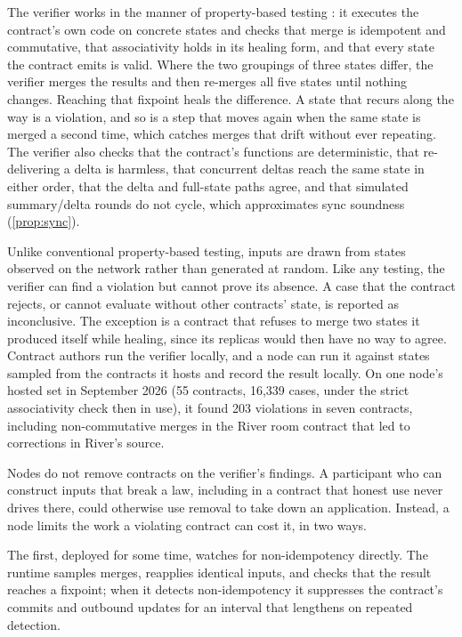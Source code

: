 The verifier works in the manner of property-based testing \citep{claessen2000quickcheck}: it executes the contract's own code on concrete states and checks that merge is idempotent and commutative, that associativity holds in its healing form, and that every state the contract emits is valid. Where the two groupings of three states differ, the verifier merges the results and then re-merges all five states until nothing changes. Reaching that fixpoint heals the difference. A state that recurs along the way is a violation, and so is a step that moves again when the same state is merged a second time, which catches merges that drift without ever repeating. The verifier also checks that the contract's functions are deterministic, that re-delivering a delta is harmless, that concurrent deltas reach the same state in either order, that the delta and full-state paths agree, and that simulated summary/delta rounds do not cycle, which approximates sync soundness (\cref{prop:sync}).

Unlike conventional property-based testing, inputs are drawn from states observed on the network rather than generated at random. Like any testing, the verifier can find a violation but cannot prove its absence. A case that the contract rejects, or cannot evaluate without other contracts' state, is reported as inconclusive. The exception is a contract that refuses to merge two states it produced itself while healing, since its replicas would then have no way to agree. Contract authors run the verifier locally, and a node can run it against states sampled from the contracts it hosts and record the result locally. On one node's hosted set in September 2026 (55 contracts, 16{,}339 cases, under the strict associativity check then in use), it found 203 violations in seven contracts, including non-commutative merges in the River room contract that led to corrections in River's source.

Nodes do not remove contracts on the verifier's findings. A participant who can construct inputs that break a law, including in a contract that honest use never drives there, could otherwise use removal to take down an application. Instead, a node limits the work a violating contract can cost it, in two ways.

The first, deployed for some time, watches for non-idempotency directly. The runtime samples merges, reapplies identical inputs, and checks that the result reaches a fixpoint; when it detects non-idempotency it suppresses the contract's commits and outbound updates for an interval that lengthens on repeated detection.

